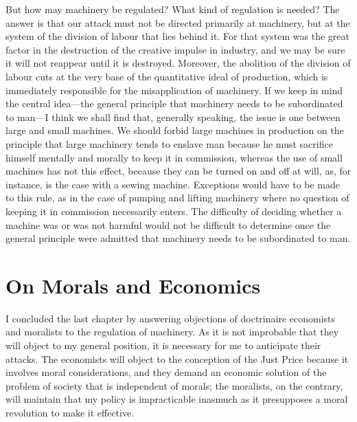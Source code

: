 \documentclass{book}
\begin{document}
But how may machinery be regulated? What kind of regulation is needed? The answer is that our attack must not be directed primarily at machinery, but at the system of the division of labour that lies behind it. For that system was the great factor in the destruction of the creative impulse in industry, and we may be sure it will not reappear until it is destroyed. Moreover, the abolition of the division of labour cuts at the very base of the quantitative ideal of production, which is immediately responsible for the misapplication of machinery. If we keep in mind the central idea—the general principle that machinery needs to be subordinated to man—I think we shall find that, generally speaking, the issue is one between large and small machines. We should forbid large machines in production on the principle that large machinery tends to enslave man because he must sacrifice himself mentally and morally to keep it in commission, whereas the use of small machines has not this effect, because they can be turned on and off at will, as, for instance, is the case with a sewing machine. Exceptions would have to be made to this rule, as in the case of pumping and lifting machinery where no question of keeping it in commission necessarily enters. The difficulty of deciding whether a machine was or was not harmful would not be difficult to determine once the general principle were admitted that machinery needs to be subordinated to man.

\chapter{On Morals and Economics}
\label{chapter-11}
I concluded the last chapter by answering objections of doctrinaire economists and moralists to the regulation of machinery. As it is not improbable that they will object to my general position, it is necessary for me to anticipate their attacks. The economists will object to the conception of the Just Price because it involves moral considerations, and they demand an economic solution of the problem of society that is independent of morals; the moralists, on the contrary, will maintain that my policy is impracticable inasmuch as it presupposes a moral revolution to make it effective.
\end{document}
